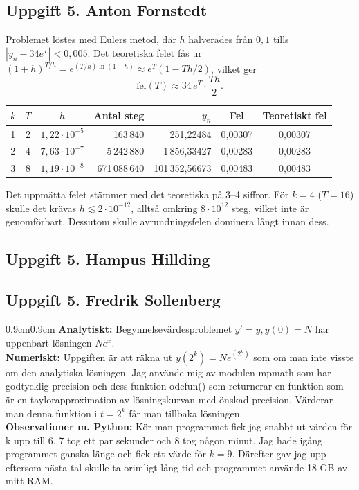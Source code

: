 \documentclass{article}
\begin{document}
\subsection*{Uppgift 5. Anton Fornstedt}

Problemet löstes med Eulers metod, där $h$ halverades från $0{,}1$ tills
$|y_n - 34e^{T}| < 0{,}005$. Det teoretiska felet fås ur
$(1+h)^{T/h} = e^{(T/h)\ln(1+h)} \approx e^{T}(1 - Th/2)$, vilket ger
\[
  \text{fel}(T) \approx 34\, e^{T} \cdot \frac{T h}{2}.
\]

\begin{center}
\begin{tabular}{c c c r r c c}
\hline
$k$ & $T$ & $h$ & Antal steg & $y_n$ & Fel & Teoretiskt fel \\
\hline
1 & 2 & $1{,}22 \cdot 10^{-5}$ & 163\,840     & 251{,}22484     & 0{,}00307 & 0{,}00307 \\
2 & 4 & $7{,}63 \cdot 10^{-7}$ & 5\,242\,880   & 1\,856{,}33427  & 0{,}00283 & 0{,}00283 \\
3 & 8 & $1{,}19 \cdot 10^{-8}$ & 671\,088\,640 & 101\,352{,}56673 & 0{,}00483 & 0{,}00483 \\
\hline
\end{tabular}
\end{center}

Det uppmätta felet stämmer med det teoretiska på 3--4 siffror. För $k = 4$
($T = 16$) skulle det krävas $h \lesssim 2 \cdot 10^{-12}$, alltså omkring
$8 \cdot 10^{12}$ steg, vilket inte är genomförbart. Dessutom skulle
avrundningsfelen dominera långt innan dess.



\subsection*{Uppgift 5. Hampus Hillding}
\subsection*{Uppgift 5. Fredrik Sollenberg}
\begin{adjustwidth}{0.9cm}{0.9cm}
\textbf{Analytiskt:} Begynnelsevärdesproblemet $y'=y, y(0)=N$ har uppenbart lösningen $Ne^x$. 
\medskip\\
\textbf{Numeriskt:} Uppgiften är att räkna ut $y(2^k)=Ne^{(2^k)}$ som om man inte visste om den analytiska lösningen. Jag använde mig av modulen mpmath som har godtycklig precision och dess funktion odefun() som returnerar en funktion som är en taylorapproximation av lösningskurvan med önskad precision. Värderar man denna funktion i $t=2^k$ får man tillbaka lösningen. 
\medskip\\
\textbf{Observationer m. Python:} Kör man programmet fick jag snabbt ut värden för k upp till 6. 7 tog ett par sekunder och 8 tog någon minut. Jag hade igång programmet ganska länge och fick ett värde för $k=9$. Därefter gav jag upp eftersom nästa tal skulle ta orimligt lång tid och programmet använde 18 GB av mitt RAM.
\end{adjustwidth}
\end{document}
